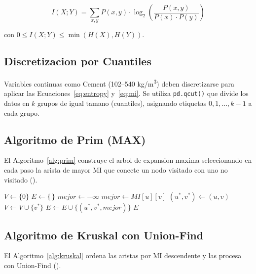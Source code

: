 \documentclass[12pt, a4paper]{article}
\begin{document}
\begin{equation}\label{eq:mi}
    \boxed{\; I(X;Y) = \sum_{x,y} P(x,y) \cdot
    \log_2\!\left(\frac{P(x,y)}{P(x)\cdot P(y)}\right) \;}
\end{equation}

con $0 \le I(X;Y) \le \min(H(X), H(Y))$.

\subsection{Discretizacion por Cuantiles}

Variables continuas como Cement (102--540 kg/m\textsuperscript{3}) deben
discretizarse para aplicar las Ecuaciones~\ref{eq:entropy} y~\ref{eq:mi}.
Se utiliza \texttt{pd.qcut()} que divide los datos en $k$ grupos de igual
tamano (cuantiles), asignando etiquetas $0, 1, \dots, k-1$ a cada grupo.

\subsection{Algoritmo de Prim (MAX)}

El Algoritmo~\ref{alg:prim} construye el arbol de expansion maxima
seleccionando en cada paso la arista de mayor MI que conecte un nodo
visitado con uno no visitado (\cite{prim1957}).

\begin{algorithm}[H]
\caption{Prim --- Arbol de Expansion Maxima (MAX, MI)}\label{alg:prim}
\begin{algorithmic}[1]
    \State $V \gets \{0\}$ 
    \State $E \gets \{\,\}$
        \State $mejor \gets -\infty$
                    \State $mejor \gets MI[u][v]$
                    \State $(u^*, v^*) \gets (u, v)$
                \EndIf
            \EndFor
        \EndFor
        \State $V \gets V \cup \{v^*\}$
        \State $E \gets E \cup \{(u^*, v^*, mejor)\}$
    \EndWhile
    \State \Return $E$
\EndFunction
\end{algorithmic}
\end{algorithm}

\subsection{Algoritmo de Kruskal con Union-Find}

El Algoritmo~\ref{alg:kruskal} ordena las aristas por MI descendente y
las procesa con Union-Find (\cite{kruskal1956}).
\end{document}

